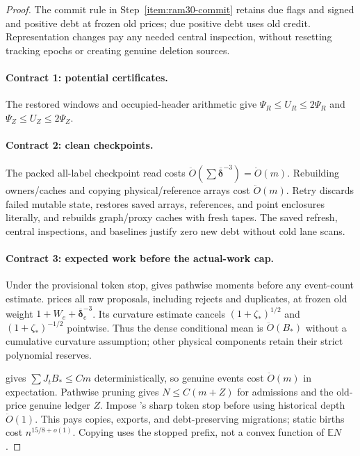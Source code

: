 \documentclass[11pt]{article}
\theoremstyle{remark}
\newcommand{\ddeltabar}{\overline{\boldsymbol{\delta}}}
\newcommand{\Ex}{\mathbb E}
\renewcommand{\O}{\ddot{O}}
\begin{document}
\begin{proof}
The commit rule in Step~\ref{item:ram30-commit} retains due flags and signed and
positive debt at frozen old prices; due positive debt uses old credit.
Representation changes pay any needed central inspection, without resetting
tracking epochs or creating genuine deletion sources.

\paragraph{Contract 1: potential certificates.}
The restored windows and occupied-header arithmetic give $\Psi_R\le
U_R\le2\Psi_R$ and $\Psi_Z\le U_Z\le2\Psi_Z$.

\paragraph{Contract 2: clean checkpoints.}
The packed all-label checkpoint read costs $\O(\sum\ddeltabar^{-3})=\O(m)$.
Rebuilding owners/caches and copying physical/reference arrays cost
$\O(m)$.
Retry discards failed mutable state, restores saved arrays, references, and
point enclosures literally, and rebuilds graph/proxy caches with fresh tapes.
The saved refresh, central inspections, and baselines justify zero new debt
without cold lane scans.

\paragraph{Contract 3: expected work before the actual-work cap.}
Under the provisional token stop,  gives
pathwise moments before any event-count estimate.
 prices all raw proposals, including rejects and
duplicates, at frozen old weight $1+W_e+\ddeltabar_e^{-3}$.
Its curvature estimate cancels $(1+\zeta_*)^{1/2}$ and $(1+\zeta_*)^{-1/2}$
pointwise.
Thus the dense conditional mean is $\O(B_*)$ without a cumulative
curvature assumption; other physical components retain their strict polynomial
reserves.

 gives $\sum J_tB_*\le Cm$ deterministically, so
genuine events cost $\O(m)$ in expectation.
Pathwise pruning gives $N\le C(m+Z)$ for admissions and the old-price genuine
ledger $Z$.
Impose 's sharp token stop before using
historical depth $\O(1)$.
This pays copies, exports, and debt-preserving migrations; static births cost
$n^{15/8+o(1)}$.
Copying uses the stopped prefix, not a convex function of $\Ex N$.


\end{proof}
\end{document}

